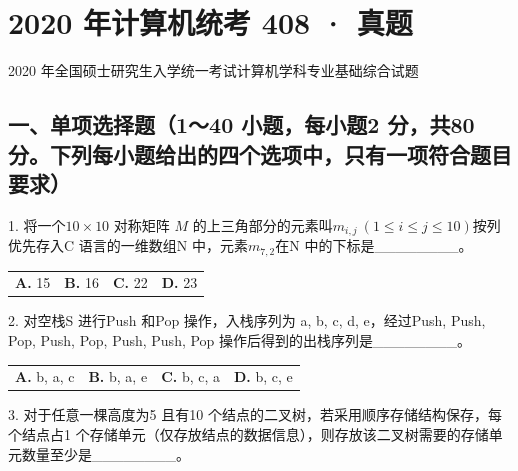 \documentclass[UTF8,11pt]{ctexart}
\begin{document}
\section*{2020 年计算机统考 408 · 真题}
2020 年全国硕士研究生入学统一考试计算机学科专业基础综合试题


\subsection*{一、单项选择题（1～40 小题，每小题2 分，共80 分。下列每小题给出的四个选项中，只有一项符合题目要求）}

1. 将一个\(\displaystyle 10\times10\) 对称矩阵 \(\displaystyle M\) 的上三角部分的元素叫\(\displaystyle m_{i,\allowbreak j}\ (1\le i\le j\le10)\)按列优先存入C 语言的一维数组N 中，元素\(\displaystyle m_{7,\allowbreak 2}\)在N 中的下标是\_\_\_\_\_\_\_\_。


\begin{center}\begin{tabular}{>{\raggedright\arraybackslash}p{\dimexpr(\linewidth-8\tabcolsep)/4\relax}>{\raggedright\arraybackslash}p{\dimexpr(\linewidth-8\tabcolsep)/4\relax}>{\raggedright\arraybackslash}p{\dimexpr(\linewidth-8\tabcolsep)/4\relax}>{\raggedright\arraybackslash}p{\dimexpr(\linewidth-8\tabcolsep)/4\relax}}
\textbf{A.} 15 & \textbf{B.} 16 & \textbf{C.} 22 & \textbf{D.} 23\\[.35em]\end{tabular}\end{center}

2. 对空栈S 进行Push 和Pop 操作，入栈序列为 a, b, c, d, e，经过Push, Push, Pop, Push, Pop, Push, Push, Pop 操作后得到的出栈序列是\_\_\_\_\_\_\_\_。


\begin{center}\begin{tabular}{>{\raggedright\arraybackslash}p{\dimexpr(\linewidth-8\tabcolsep)/4\relax}>{\raggedright\arraybackslash}p{\dimexpr(\linewidth-8\tabcolsep)/4\relax}>{\raggedright\arraybackslash}p{\dimexpr(\linewidth-8\tabcolsep)/4\relax}>{\raggedright\arraybackslash}p{\dimexpr(\linewidth-8\tabcolsep)/4\relax}}
\textbf{A.} b, a, c & \textbf{B.} b, a, e & \textbf{C.} b, c, a & \textbf{D.} b, c, e\\[.35em]\end{tabular}\end{center}

3. 对于任意一棵高度为5 且有10 个结点的二叉树，若采用顺序存储结构保存，每个结点占1 个存储单元（仅存放结点的数据信息），则存放该二叉树需要的存储单元数量至少是\_\_\_\_\_\_\_\_。
\end{document}
